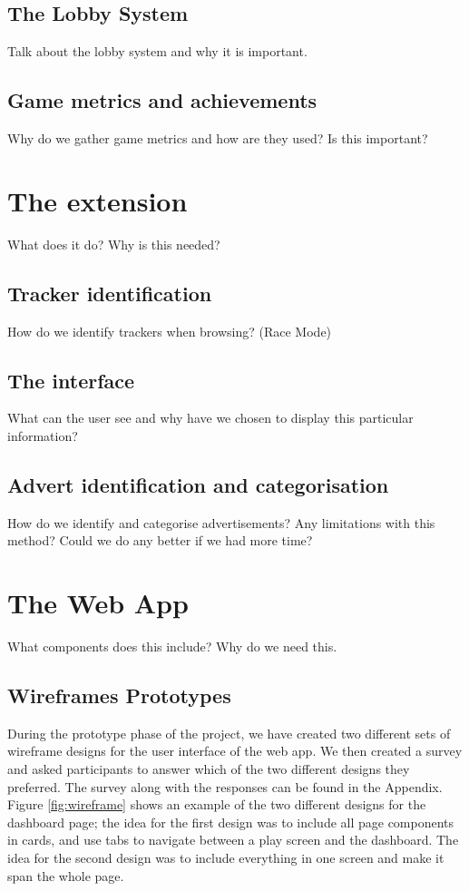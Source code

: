 \documentclass{l4proj}
\begin{document}
\subsection{The Lobby System}
Talk about the lobby system and why it is important.

\subsection{Game metrics and achievements}
Why do we gather game metrics and how are they used? Is this important?

\section{The extension}
What does it do? Why is this needed?

\subsection{Tracker identification}
How do we identify trackers when browsing? (Race Mode)

\subsection{The interface}
What can the user see and why have we chosen to display this particular information?

\subsection{Advert identification and categorisation}
How do we identify and categorise advertisements? Any limitations with this method? Could we do any better if we had more time?

\section{The Web App}
What components does this include? Why do we need this.

\subsection{Wireframes Prototypes}
During the prototype phase of the project, we have created two different sets of wireframe designs for the user interface of the web app. We then created a survey and asked participants to answer which of the two different designs they preferred. The survey along with the responses can be found in the Appendix. Figure \ref{fig:wireframe} shows an example of the two different designs for the dashboard page; the idea for the first design was to include all page components in cards, and use tabs to navigate between a play screen and the dashboard. The idea for the second design was to include everything in one screen and make it span the whole page.
\end{document}
